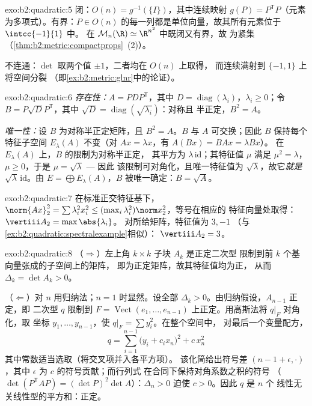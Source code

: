 \begin{solution}{exo:b2:quadratic:5}
闭：$O(n) = g^{-1}(\{I\})$，其中连续映射 $g(P) =
P^{\mathsf T}P$（元素为多项式）。有界：$P
\in O(n)$ 的每一列都是单位向量，故其所有元素位于 $\intcc{-1}{1}$ 中。
在 $\mathcal{M}_n(\R) \simeq \R^{n^2}$ 中既闭又有界，故
为紧集（\cref{thm:b2:metric:compactprops}~(2)）。

不连通：$\det$ 取两个值 $\pm1$，二者均在 $O(n)$ 上取得，
而连续满射到 $\{-1, 1\}$ 上将空间分裂
（即\cref{ex:b2:metric:glnr}中的论证）。
\end{solution}

\begin{solution}{exo:b2:quadratic:6}
\emph{存在性：}$A = PDP^{\mathsf T}$，其中 $D =
\operatorname{diag}(\lambda_i)$，$\lambda_i \geq 0$；令 $B =
P\sqrt D P^{\mathsf T}$，其中 $\sqrt D =
\operatorname{diag}(\sqrt{\lambda_i})$：对称且
半正定，$B^2 = A$。

\emph{唯一性：}设 $B$ 为对称半正定矩阵，且 $B^2 = A$。$B$
与 $A$ 可交换；因此 $B$ 保持每个特征子空间
$E_\lambda(A)$ 不变（对 $Ax = \lambda x$，有 $A(Bx) = BAx = \lambda Bx$）。
在 $E_\lambda(A)$ 上，$B$ 的限制为对称半正定，
其平方为 $\lambda\,\mathrm{id}$；其特征值 $\mu$ 满足 $\mu^2
= \lambda$，$\mu \geq 0$，于是 $\mu = \sqrt\lambda$ --- 因此
该限制可对角化，且唯一特征值为
$\sqrt\lambda$，故它\emph{就是} $\sqrt\lambda\,\mathrm{id}$。由 $E =
\bigoplus E_\lambda(A)$，$B$ 被唯一确定：$B = \sqrt A$。
\end{solution}

\begin{solution}{exo:b2:quadratic:7}
在标准正交特征基下，$\norm{Ax}_2^2 = \sum \lambda_i^2
x_i^2 \leq (\max_i \lambda_i^2)\norm x_2^2$，等号在相应的
特征向量处取得：$\vertiii A_2 = \max\abs{\lambda_i}$。
对所给矩阵，特征值为 $3, -1$
（与\cref{ex:b2:quadratic:spectralexample}相似）：
$\vertiii A_2 = 3$。
\end{solution}

\begin{solution}{exo:b2:quadratic:8}
（$\Rightarrow$）左上角 $k \times k$ 子块 $A_k$ 是正定二次型
限制到前 $k$ 个基向量张成的子空间上的矩阵，
即为正定矩阵，故其特征值均为正，
从而 $\Delta_k = \det A_k > 0$。

（$\Leftarrow$）对 $n$ 用归纳法；$n = 1$ 时显然。设全部
$\Delta_k > 0$。由归纳假设，$A_{n-1}$ 正定，即
二次型 $q$ 限制到 $F = \operatorname{Vect}(e_1, \dots,
e_{n-1})$ 上正定。用高斯法将 $q|_F$ 对角化，取
坐标 $y_1, \dots, y_{n-1}$，使 $q|_F = \sum y_i^2$。在整个空间中，
对最后一个变量配方，
\[
q = \sum_{i=1}^{n-1} \bigl(y_i + c_i x_n\bigr)^2 + c\,x_n^2
\]
其中常数适当选取（将交叉项并入各平方项）。
该化简给出符号差 $(n-1 + \epsilon, \cdot)$，其中
$\epsilon$ 为 $c$ 的符号贡献；而行列式
在合同下保持对角系数之积的符号
（$\det(P^{\mathsf T}AP) = (\det P)^2\det A$）：$\Delta_n
> 0$ 迫使 $c > 0$。因此 $q$ 是 $n$ 个
线性无关线性型的平方和：正定。
\end{solution}

